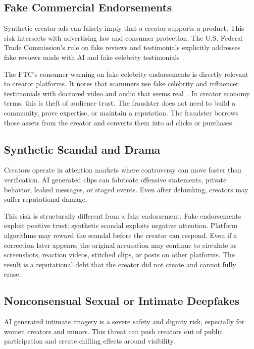 \documentclass[11pt]{article}
\begin{document}
\subsection{Fake Commercial Endorsements}

Synthetic creator ads can falsely imply that a creator supports a product. This risk intersects with advertising law and consumer protection. The U.S. Federal Trade Commission's rule on fake reviews and testimonials explicitly addresses fake reviews made with AI and fake celebrity testimonials~\cite{ftc2024reviews}.

The FTC's consumer warning on fake celebrity endorsements is directly relevant to creator platforms. It notes that scammers use fake celebrity and influencer testimonials with doctored video and audio that seems real~\cite{ftc2024celebrity}. In creator economy terms, this is theft of audience trust. The fraudster does not need to build a community, prove expertise, or maintain a reputation. The fraudster borrows those assets from the creator and converts them into ad clicks or purchases.

\subsection{Synthetic Scandal and Drama}

Creators operate in attention markets where controversy can move faster than verification. AI generated clips can fabricate offensive statements, private behavior, leaked messages, or staged events. Even after debunking, creators may suffer reputational damage.

This risk is structurally different from a fake endorsement. Fake endorsements exploit positive trust; synthetic scandal exploits negative attention. Platform algorithms may reward the scandal before the creator can respond. Even if a correction later appears, the original accusation may continue to circulate as screenshots, reaction videos, stitched clips, or posts on other platforms. The result is a reputational debt that the creator did not create and cannot fully erase.

\subsection{Nonconsensual Sexual or Intimate Deepfakes}

AI generated intimate imagery is a severe safety and dignity risk, especially for women creators and minors. This threat can push creators out of public participation and create chilling effects around visibility.
\end{document}
